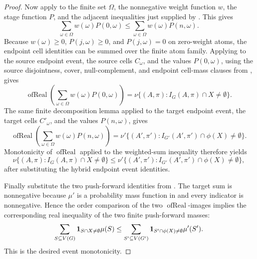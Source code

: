 \begin{proof}
Now apply  to the
finite set \(\Omega\), the nonnegative weight function \(w\), the stage
function \(P\), and the adjacent inequalities just supplied by
.  This gives
\[
\sum_{\omega\in\Omega}w(\omega)P(0,\omega)
\le
\sum_{\omega\in\Omega}w(\omega)P(n,\omega).
\]
Because \(w(\omega)\ge0\), \(P(j,\omega)\ge0\), and \(P(j,\omega)=0\) on
zero-weight atoms, the endpoint cell identities can be summed over the finite
atom family.  Applying
 to the source endpoint
event, the source cells \(C_\omega\), and the values \(P(0,\omega)\), using
the source disjointness, cover, null-complement, and endpoint cell-mass
clauses from , gives
\[
\operatorname{ofReal}\!\left(\sum_{\omega\in\Omega}w(\omega)P(0,\omega)\right)
=
\nu\{(A,\pi):I_G(A,\pi)\cap X\ne\emptyset\}.
\]
The same finite decomposition lemma applied to the target endpoint event, the
target cells \(C'_\omega\), and the values \(P(n,\omega)\), gives
\[
\operatorname{ofReal}\!\left(\sum_{\omega\in\Omega}w(\omega)P(n,\omega)\right)
=
\nu'\{(A',\pi'):I_{G'}(A',\pi')\cap\phi(X)\ne\emptyset\}.
\]
Monotonicity of \(\operatorname{ofReal}\) applied to the weighted-sum
inequality therefore yields
\[
\nu\{(A,\pi):I_G(A,\pi)\cap X\ne\emptyset\}
\le
\nu'\{(A',\pi'):I_{G'}(A',\pi')\cap\phi(X)\ne\emptyset\},
\]
after substituting the hybrid endpoint event identities.

Finally substitute the two push-forward identities from
.  The target sum is nonnegative
because \(\mu'\) is a probability mass function in
 and every indicator is nonnegative.
Hence the order comparison of the two \(\operatorname{ofReal}\)-images
implies the corresponding real inequality of the two finite push-forward
masses:
\[
\sum_{S\subseteq V(G)} {\bf 1}_{S\cap X\ne\emptyset}\mu(S)
\le
\sum_{S'\subseteq V(G')} {\bf 1}_{S'\cap\phi(X)\ne\emptyset}\mu'(S').
\]
This is the desired event monotonicity.
\end{proof}
